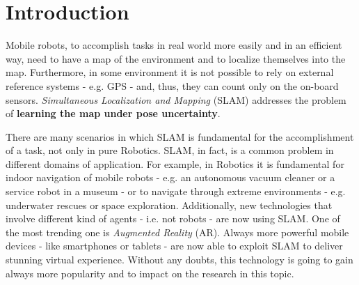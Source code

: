 \chapter{Introduction}\label{ch:intro}
Mobile robots, to accomplish tasks in real world more easily and in an efficient way, need to have a map of the environment and to localize themselves into the map. Furthermore, in some environment it is not possible to rely on external reference systems - e.g. GPS - and, thus, they can count only on the on-board sensors. \textit{Simultaneous Localization and Mapping} (SLAM) addresses the problem of \textbf{learning the map under pose uncertainty}.

There are many scenarios in which SLAM is fundamental for the accomplishment of a task, not only in pure Robotics. SLAM, in fact, is a common problem in different domains of application. For example, in Robotics it is fundamental for indoor navigation of mobile robots - e.g. an autonomous vacuum cleaner or a service robot in a museum - or to navigate through extreme environments - e.g. underwater rescues or space exploration. Additionally, new technologies that involve different kind of agents - i.e. not robots - are now using SLAM. One of the most trending one is \textit{Augmented Reality} (AR). Always more powerful mobile devices - like smartphones or tablets - are now able to exploit SLAM to deliver stunning virtual experience. Without any doubts, this technology is going to gain always more popularity and to impact on the research in this topic.
\vspace{5px}

